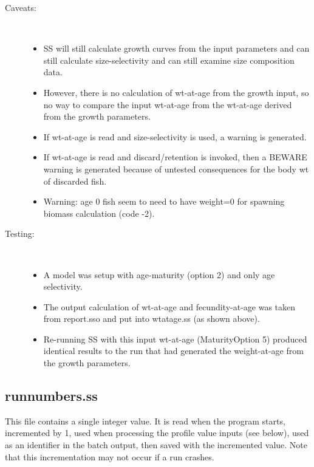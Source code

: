 \begin{description}
	\item[Caveats:]\hfill\\
		 \begin{itemize}
			\item SS will still calculate growth curves from the input parameters and can still calculate size-selectivity and can still examine size composition data.
			\item However, there is no calculation of wt-at-age from the growth input, so no way to compare the input wt-at-age from the wt-at-age derived from the growth parameters.
			\item If wt-at-age is read and size-selectivity is used, a warning is generated.
			\item If wt-at-age is read and discard/retention is invoked, then a BEWARE warning is generated because of untested consequences for the body wt of discarded fish.
			\item Warning:  age 0 fish seem to need to have weight=0 for spawning biomass calculation (code -2).
		\end{itemize}
\end{description}

\begin{description}
	\item[Testing:]\hfill\\
		\begin{itemize}
			\item A model was setup with age-maturity (option 2) and only age selectivity.
			\item The output calculation of wt-at-age and fecundity-at-age was taken from report.sso and put into wtatage.ss (as shown above).
			\item Re-running SS with this input wt-at-age (Maturity\textunderscore Option 5) produced identical results to the run that had generated the weight-at-age from the growth parameters.
		\end{itemize}
\end{description}


\subsection{runnumbers.ss}
This file contains a single integer value.  It is read when the program starts, incremented by 1, used when processing the profile value inputs (see below), used as an identifier in the batch output, then saved with the incremented value.  Note that this incrementation may not occur if a run crashes.

